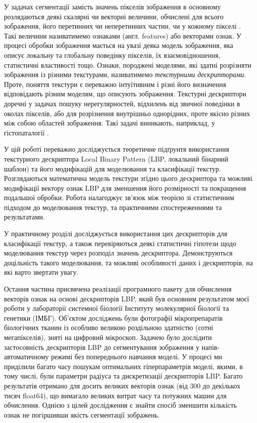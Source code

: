 У задачах сегментації замість значень пікселів зображення в основному розлядаються деякі скалярні чи векторні величини,
обчислені для всього зображення, його перетинних чи неперетинних частин, чи у кожному пікселі \cite{belsare2015, simon2018, esteva2017}. 
Такі величини називатимемо ознаками (англ. features) або векторами ознак.
У процесі обробки зображення мається на увазі деяка модель зображення, яка описує локальну та глобальну поведінку пікселів, їх взаємовідношення, статистичні властивості тощо.
Ознаки, породжені моделями, які здатні розрізняти зображення із різними текстурами, називатимемо \emph{текстурними дескрипторами}.
Проте, поняття текстури є переважно інтуїтивним і різні його визначення відповідають різним моделям, що описують зображення.  
Текстурні дескриптори доречні у задачах пошуку нерегулярностей, відхилень від звичної поведінки в околах пікселів, 
або для розрізнення внутрішньо однорідних, проте якісно різних між собою областей зображення. 
Такі задачі виникають, наприклад, у гістопаталогії \cite{simon2018}.

У цій роботі переважно досліджується теоретичне підґрунтя використання текстурного дескриптора Local Binary Pattern 
(LBP, локальний бінарний шаблон) \cite{ojala2002} та його модифікацій для моделювання та класифікації текстур.
Розглядаються математична модель текстури згідно цього дескриптора та можливі модифікації вектору ознак LBP для зменшення його розмірності та покращення подальшої обробки.
Робота налагоджує зв'язок між теорією зі статистичним підходом до моделювання текстур, та практичними спостереженнями та результатами.

У практичному розділі досліджується використання цих дескрипторів для класифікації текстур, 
а також перевіряються деякі статистичні гіпотези щодо моделювання текстур через розподіл значень дескриптора.
Демонструються доцільність такого моделювання, та можливі особливості даних і дескрипторів, на які варто звертати увагу.

Остання частина присвячена реалізації програмного пакету для обчислення векторів ознак на основі дескрипторів LBP, який був
основним результатом моєї роботи у лабораторії системної біології Інституту молекулярної біології та генетики (ІМБГ).
Об'єктом досліджень були фотографії мікропрепаратів біологічних тканин із особливо великою роздільною здатністю (сотні мегапікселів), зняті на цифровий мікроскоп.
Задачею було дослідити застосовність дескрипторів LBP до сегментування зображення у напів-автоматичному режимі без попереднього навчання моделі.
У процесі ми приділили багато часу пошукам оптимальних гіперпараметрів моделі, якими, в тому числі, були параметри радіуса та дискретизації дескрипторів LBP.
Багато результатів отримано для досить великих векторів ознак (від 300 до декількох тисяч float64), що вимагало великих витрат часу та потужних машин для обчислення.
Однією з цілей дослідження є знайти спосіб зменшити кількість ознак не погіршивши якість сегментації зображень.

